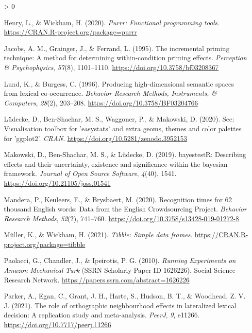 \documentclass[
  english,
  man,floatsintext]{apa6}
\newlength{\cslhangindent}
\newenvironment{CSLReferences}[2] %
 {%
  \setlength{\parindent}{0pt}
  \ifodd #1 \everypar{\setlength{\hangindent}{\cslhangindent}}\ignorespaces\fi
  \ifnum #2 > 0
  \setlength{\parskip}{#2\baselineskip}
  \fi
 }%
 {}
\begin{document}
\begin{CSLReferences}{1}{0}
\leavevmode\hypertarget{ref-R-purrr}{}%
Henry, L., \& Wickham, H. (2020). \emph{Purrr: Functional programming tools}. \url{https://CRAN.R-project.org/package=purrr}

\leavevmode\hypertarget{ref-Jacobs_1995}{}%
Jacobs, A. M., Grainger, J., \& Ferrand, L. (1995). The incremental priming technique: A method for determining within-condition priming effects. \emph{Perception {\&} Psychophysics}, \emph{57}(8), 1101--1110. \url{https://doi.org/10.3758/bf03208367}

\leavevmode\hypertarget{ref-lund1996}{}%
Lund, K., \& Burgess, C. (1996). Producing high-dimensional semantic spaces from lexical co-occurrence. \emph{Behavior Research Methods, Instruments, \& Computers}, \emph{28}(2), 203--208. \url{https://doi.org/10.3758/BF03204766}

\leavevmode\hypertarget{ref-R-see}{}%
Lüdecke, D., Ben-Shachar, M. S., Waggoner, P., \& Makowski, D. (2020). See: Visualisation toolbox for 'easystats' and extra geoms, themes and color palettes for 'ggplot2'. \emph{CRAN}. \url{https://doi.org/10.5281/zenodo.3952153}

\leavevmode\hypertarget{ref-R-bayestestR}{}%
Makowski, D., Ben-Shachar, M. S., \& Lüdecke, D. (2019). bayestestR: Describing effects and their uncertainty, existence and significance within the bayesian framework. \emph{Journal of Open Source Software}, \emph{4}(40), 1541. \url{https://doi.org/10.21105/joss.01541}

\leavevmode\hypertarget{ref-mandera2020}{}%
Mandera, P., Keuleers, E., \& Brysbaert, M. (2020). Recognition times for 62 thousand English words: Data from the English Crowdsourcing Project. \emph{Behavior Research Methods}, \emph{52}(2), 741--760. \url{https://doi.org/10.3758/s13428-019-01272-8}

\leavevmode\hypertarget{ref-R-tibble}{}%
Müller, K., \& Wickham, H. (2021). \emph{Tibble: Simple data frames}. \url{https://CRAN.R-project.org/package=tibble}

\leavevmode\hypertarget{ref-paolacciRunningExperimentsAmazon2010}{}%
Paolacci, G., Chandler, J., \& Ipeirotis, P. G. (2010). \emph{Running {Experiments} on {Amazon Mechanical Turk}} (SSRN Scholarly Paper ID 1626226). {Social Science Research Network}. \url{https://papers.ssrn.com/abstract=1626226}

\leavevmode\hypertarget{ref-Parker_2021}{}%
Parker, A., Egan, C., Grant, J. H., Harte, S., Hudson, B. T., \& Woodhead, Z. V. J. (2021). The role of orthographic neighbourhood effects in lateralized lexical decision: A replication study and meta-analysis. \emph{{PeerJ}}, \emph{9}, e11266. \url{https://doi.org/10.7717/peerj.11266}


\end{CSLReferences}
\end{document}
